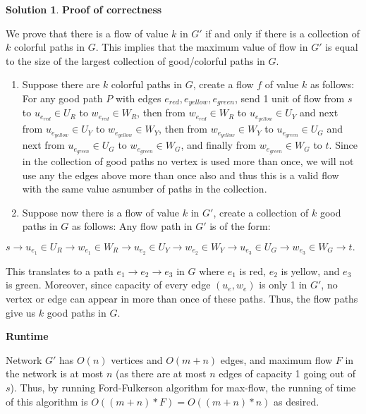 \documentclass{article}
\theoremstyle{definition}
\newtheorem*{solution*}{Solution}
\newenvironment{solution}{\begin{solution*}}{{} \end{solution*}}
\begin{document}
\begin{solution}
		\item \textbf{Proof of correctness}
		\item We prove that there is a flow of value $k$ in $G'$ if and only if there is a collection of $k$ colorful paths in $G$. This implies that the maximum value of flow in $G'$ is equal to the size of the largest collection of good/colorful paths in $G$.
		\begin{enumerate}
		\item Suppose there are $k$ colorful paths in $G$, create a flow $f$ of value $k$ as follows:
		For any good path $P$ with edges $e_{red}, e_{yellow}, e_{green}$, send 1 unit of flow from $s$ to $u_{e_{red}} \in U_R$ to $w_{e_{red}} \in W_R$, then from $w_{e_{red}} \in W_R$ to $u_{e_{yellow}} \in U_Y$ and next from $u_{e_{yellow}} \in U_Y$ to $w_{e_{yellow}} \in W_Y$, then from $w_{e_{yellow}} \in W_Y$ to $u_{e_{green}} \in U_G$ and next from $u_{e_{green}} \in U_G$ to $w_{e_{green}} \in W_G$, and finally from $w_{e_{green}} \in W_G$ to $t$. Since in the collection of good paths no vertex is used more than once, we will not use any the edges above more than once also and thus this is a valid flow with the same value asnumber of paths in the collection.
		\item Suppose now there is a flow of value $k$ in $G'$, create a collection of $k$ good paths in $G$ as follows: Any flow path in $G'$ is of the form:
		\end{enumerate}
		\item \quad\quad\quad\quad $s \rightarrow u_{e_1} \in U_R \rightarrow w_{e_1} \in W_R \rightarrow u_{e_2} \in U_Y \rightarrow w_{e_2} \in W_Y \rightarrow u_{e_3} \in U_G \rightarrow w_{e_3} \in W_G \rightarrow t.$
		\item This translates to a path $e_1 \rightarrow e_2 \rightarrow e_3$ in $G$ where $e_1$ is red, $e_2$ is yellow, and $e_3$ is green. Moreover, since capacity of every edge $(u_e, w_e)$ is only 1 in $G'$, no vertex or edge can appear in more than once of these paths. Thus, the flow paths give us $k$ good paths in $G$.
		
		\item\textbf{Runtime}
		\item Network $G'$ has $O(n)$ vertices and $O(m+n)$ edges, and maximum flow $F$ in the network is at most $n$ (as there are at most $n$ edges of capacity 1 going out of $s$). Thus, by running Ford-Fulkerson algorithm for max-flow, the running of time of this algorithm is $O((m+n)*F) = O((m+n)*n)$ as desired.


		\end{solution}
		
\end{document}
